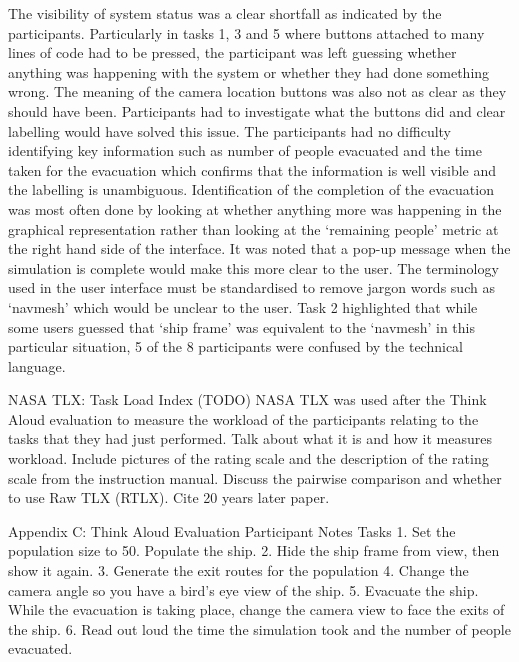 \documentclass{article}
\begin{document}
    The visibility of system status was a clear shortfall as indicated by the participants. Particularly in tasks 1, 3 and 5 where buttons attached to many lines of code had to be pressed, the participant was left guessing whether anything was happening with the system or whether they had done something wrong.
    The meaning of the camera location buttons was also not as clear as they should have been. Participants had to investigate what the buttons did and clear labelling would have solved this issue.
    The participants had no difficulty identifying key information such as number of people evacuated and the time taken for the evacuation which confirms that the information is well visible and the labelling is unambiguous.
    Identification of the completion of the evacuation was most often done by looking at whether anything more was happening in the graphical representation rather than looking at the ‘remaining people’ metric at the right hand side of the interface. It was noted that a pop-up message when the simulation is complete would make this more clear to the user.
    The terminology used in the user interface must be standardised to remove jargon words such as ‘navmesh’ which would be unclear to the user. Task 2 highlighted that while some users guessed that ‘ship frame’ was equivalent to the ‘navmesh’ in this particular situation, 5 of the 8 participants were confused by the technical language. 


NASA TLX: Task Load Index (TODO)
NASA TLX was used after the Think Aloud evaluation to measure the workload of the participants relating to the tasks that they had just performed. Talk about what it is and how it measures workload.
Include pictures of the rating scale and the description of the rating scale from the instruction manual.
Discuss the pairwise comparison and whether to use Raw TLX (RTLX). Cite 20 years later paper.

Appendix C: Think Aloud Evaluation Participant Notes
Tasks
1. Set the population size to 50. Populate the ship.
2. Hide the ship frame from view, then show it again.
3. Generate the exit routes for the population
4. Change the camera angle so you have a bird’s eye view of the ship.
5. Evacuate the ship. While the evacuation is taking place, change the camera view to face the exits of the ship.
6. Read out loud the time the simulation took and the number of people evacuated.
\end{document}
